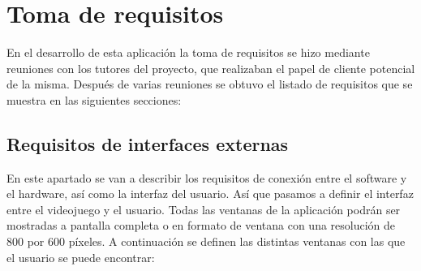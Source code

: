 
\section{Toma de requisitos}

En el desarrollo de esta aplicación la toma de requisitos se hizo mediante reuniones con los tutores del proyecto,
que realizaban el papel de cliente potencial de la misma. Después de varias reuniones se obtuvo el listado de requisitos
que se muestra en las siguientes secciones:


\subsection{Requisitos de interfaces externas}

En este apartado se van a describir los requisitos de conexión entre el software y el hardware, así como la interfaz
del usuario. Así que pasamos a definir el interfaz entre el videojuego y el usuario. Todas las ventanas de la aplicación podrán
ser mostradas a pantalla completa o en formato de ventana con una resolución de 800 por 600 píxeles. A
continuación se definen las distintas ventanas con las que el usuario se puede encontrar:



